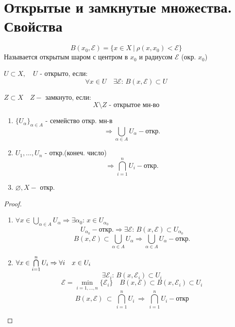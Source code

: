\documentclass[geometry.tex]{subfiles}
\begin{document}
  \section{Открытые и замкнутые множества. Свойства}

  \begin{Definition}
      \[B(x_0, \mathcal{E}) = \{x \in X \ | \ \rho(x, x_0) < \mathcal{E}\}\]
      Называется открытым шаром с центром в $x_0$ и радиусом $\mathcal{E}$ (окр.  $x_0$)
  \end{Definition}

  \begin{definition}
      $U \subset X, \quad U$ - открыто, если:
      \[\forall x \in U \quad \exists \mathcal{E}\text{: } B(x, \mathcal{E}) \subset U\]
  \end{definition}

  \begin{definition}
      $Z \subset X \quad Z -$ замкнуто, если:
      \[X \setminus Z \text{ - открытое мн-во}\]
  \end{definition}

  \begin{theorem}[св-ва откр. мн-в]
      \begin{enumerate}
          \item $\{ U_\alpha \}_{\alpha \in A}$ - семейство откр. мн-в
                 \[\Rightarrow \bigcup_{\alpha \in A}U_\alpha - \text{откр.}\]
          \item $U_1,...,U_n$ - откр.(конеч. число) \[\Rightarrow \bigcap_{i = 1}^n U_i - \text{откр.}\]
          \item $\varnothing, X - $ откр.
      \end{enumerate}
  \end{theorem}
  \begin{proof}
      \begin{enumerate}
          \item $\forall x \in \bigcup\limits_{\alpha \in A} U_\alpha \Rightarrow \exists \alpha_0\text{: } x \in U_{\alpha_0}$
                 \[U_{\alpha_0} - \text{откр.}\Rightarrow \exists \mathcal{E}\text{: } B(x, \mathcal{E}) \subset U_{\alpha_0}\]
                 \[B(x, \mathcal{E}) \subset \bigcup_{\alpha \in A} U_\alpha \Rightarrow
                 \bigcup_{\alpha \in A} U_\alpha - \text{откр.}\]
          \item $\forall x \in \bigcap\limits_{i = 1}^n U_i \Rightarrow \forall i \quad x \in U_i$
                \[\exists \mathcal{E}_i\text{: } B(x, \mathcal{E}_i) \subset U_i\]
                \[\mathcal{E} = \min_{i = 1,..., n}\{\mathcal{E}_i\} \quad B(x, \mathcal{E}) \subset B(x, \mathcal{E}_i) \subset U_i\]
                \[B(x, \mathcal{E}) \ \subset\  \bigcap\limits_{i=1}^n U_i\  \Rightarrow\  \bigcap\limits_{i = 1} ^ n U_i - \text{откр}\]
      \end{enumerate}
  \end{proof}
\end{document}
